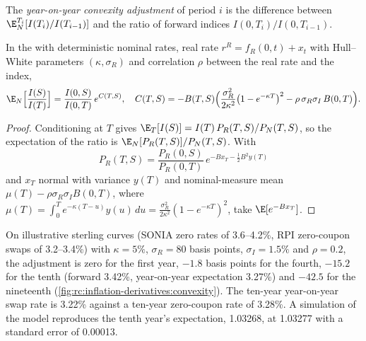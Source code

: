\begin{definition}\label{def:rc:inflation-derivatives:yoyadj}
The \emph{year-on-year convexity adjustment}
of period $i$ is the difference between $\E^{T_i}_N[I(T_i)/I(T_{i-1})]$ and the ratio of
forward indices $I(0,T_i)/I(0,T_{i-1})$.
\end{definition}

\begin{proposition}\label{prop:rc:inflation-derivatives:yoy}
In the  with deterministic nominal rates, real rate
$r^R = f_R(0,t)+x_t$ with Hull--White parameters $(\kappa,\sigma_R)$ and correlation $\rho$
between the real rate and the index,
\[
\E_N\Bigl[\frac{I(S)}{I(T)}\Bigr] = \frac{I(0,S)}{I(0,T)}\,e^{C(T,S)},\quad
C(T,S) = -B(T,S)\Bigl(\frac{\sigma_R^2}{2\kappa^2}\bigl(1-e^{-\kappa T}\bigr)^2-\rho\,\sigma_R\sigma_I\,B(0,T)\Bigr).
\]
\end{proposition}
\begin{proof}
Conditioning at $T$ gives $\E_T[I(S)] = I(T)\,P_R(T,S)/P_N(T,S)$, so the
expectation of the ratio is $\E_N[P_R(T,S)]/P_N(T,S)$. With
\[
P_R(T,S) = \frac{P_R(0,S)}{P_R(0,T)}\,e^{-Bx_T-\frac12B^2y(T)}
\]
and $x_T$ normal with variance $y(T)$ and nominal-measure mean $\mu(T)-\rho\sigma_R\sigma_IB(0,T)$,
where $\mu(T) = \int_0^Te^{-\kappa(T-u)}y(u)\,du = \frac{\sigma_R^2}{2\kappa^2}(1-e^{-\kappa T})^2$, take
$\E[e^{-Bx_T}]$.
\end{proof}

\label{lst:rc:inflation-derivatives:yoy}

\begin{example}\label{ex:rc:inflation-derivatives:conv}
On illustrative sterling curves (SONIA zero rates of 3.6--4.2\%, RPI zero-coupon
swaps of 3.2--3.4\%) with $\kappa=5\%$, $\sigma_R=80$ basis points, $\sigma_I=1.5\%$ and
$\rho=0.2$, the adjustment is zero for the first year, $-1.8$ basis points for the fourth,
$-15.2$ for the tenth (forward 3.42\%, year-on-year expectation 3.27\%) and $-42.5$ for the
nineteenth (\cref{fig:rc:inflation-derivatives:convexity}). The ten-year year-on-year swap
rate is 3.22\% against a ten-year zero-coupon rate of 3.28\%. A simulation of the model
reproduces the tenth year's expectation, 1.03268, at 1.03277 with a standard error of
0.00013.
\end{example}

